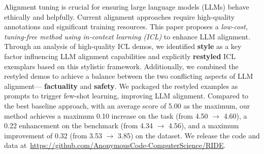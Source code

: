 Alignment tuning is crucial for ensuring large language models (LLMs) behave ethically and helpfully. 
Current alignment approaches require high-quality annotations and significant training resources. 
This paper proposes a \textit{low-cost, tuning-free method using in-context learning (ICL)} to enhance LLM alignment.
Through an analysis of high-quality ICL demos, we identified \textbf{style} as a key factor influencing LLM alignment capabilities and explicitly \textbf{restyled} ICL exemplars based on this stylistic framework. 
Additionally, we combined the restyled demos to achieve a balance between the two conflicting aspects of LLM alignment---\textbf{\color{myblue} factuality} and \textbf{\color{myred} safety}.
We packaged the restyled examples as prompts to trigger few-shot learning, improving LLM alignment. 
Compared to the best baseline approach, with an average score of 5.00 as the maximum, our method achieves a maximum 0.10 increase on the \alpaca{} task (from 4.50 $\to$ 4.60), a 0.22 enhancement on the \dataname{} benchmark (from 4.34 $\to$ 4.56), and a maximum improvement of 0.32 (from 3.53 $\to$ 3.85) on the \mtbench{} dataset.
We release the code and data at~\url{https://github.com/AnonymousCode-ComputerScience/RIDE}.